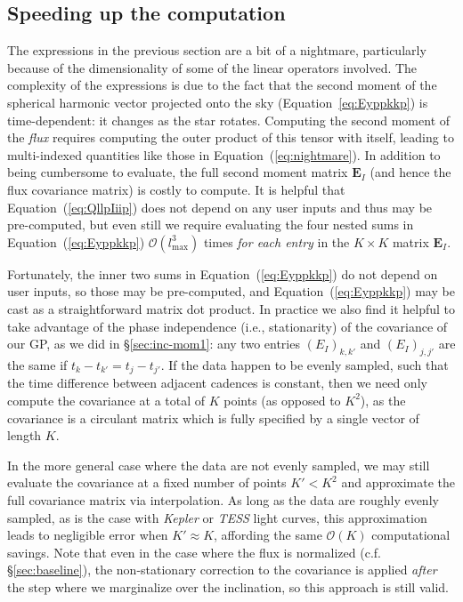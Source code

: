 \documentclass[modern]{aastex62}
\begin{document}
\subsection{Speeding up the computation}
\label{sec:speedup}
%
The expressions in the previous section are a bit of a nightmare,
particularly because of the dimensionality of some of the linear
operators involved. The complexity of the expressions is due to
the fact that the second moment of the spherical harmonic vector
projected onto the sky (Equation~\ref{eq:Eyppkkp}) is time-dependent:
it changes as the star rotates. Computing the second moment of the
\emph{flux} requires computing the outer product of this tensor
with itself, leading to multi-indexed quantities like those in
Equation~(\ref{eq:nightmare}). In addition to being cumbersome to
evaluate, the full second moment matrix $\mathbf{E}_I$
(and hence the flux covariance matrix) is costly to compute.
It is helpful that Equation~(\ref{eq:QllpIiip}) does not depend
on any user inputs and thus may be pre-computed, but even still
we require evaluating the four nested sums
in Equation~(\ref{eq:Eyppkkp})
$\mathcal{O}(l_\mathrm{max}^3)$ times
\emph{for each entry} in the $K \times K$ matrix $\mathbf{E}_I$.

Fortunately, the inner two sums in Equation~(\ref{eq:Eyppkkp})
do not depend on user inputs, so those may be pre-computed,
and Equation~(\ref{eq:Eyppkkp}) may be cast as a straightforward
matrix dot product. In practice we also find it helpful to
take advantage of the phase independence (i.e., stationarity)
of the covariance of our GP, as we did in \S\ref{sec:inc-mom1}:
any two entries $(E_I)_{k,k'}$ and $(E_I)_{j,j'}$ are
the same if $t_{k} - t_{k'} = t_{j} - t_{j'}$. If the data
happen to be evenly sampled, such that the time difference between
adjacent cadences is constant, then we need only compute the
covariance at a total of $K$ points (as opposed to $K^2$), as the
covariance is a circulant matrix which is fully specified by a
single vector of length $K$.

In the more general case where the data are not evenly sampled,
we may still evaluate the covariance at a fixed number of points
$K' < K^2$ and approximate the full covariance matrix via
interpolation. As long as the data are roughly evenly sampled,
as is the case with \emph{Kepler} or \emph{TESS} light curves,
this approximation leads to negligible error when $K' \approx K$,
affording the same $\mathcal{O}(K)$ computational savings.
Note that even in the case where the flux is normalized
(c.f. \S\ref{sec:baseline}), the non-stationary correction to the
covariance is applied \emph{after} the step where we marginalize
over the inclination, so this approach is still valid.


\end{document}
